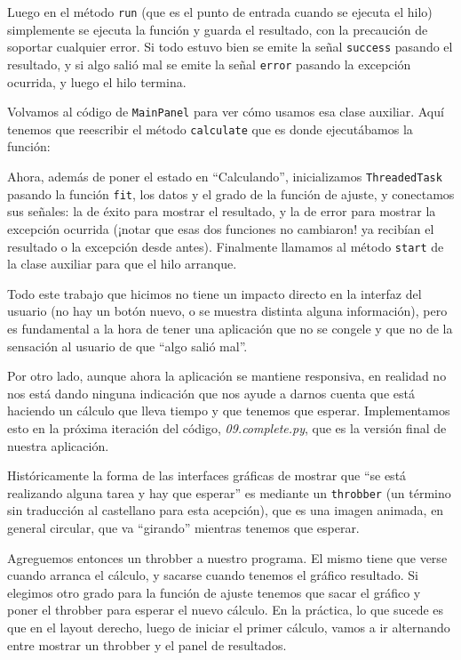 Luego en el método \texttt{run} (que es el punto de entrada cuando se ejecuta el hilo) simplemente se ejecuta la función y guarda el resultado, con la precaución de soportar cualquier error. Si todo estuvo bien se emite la señal \texttt{success} pasando el resultado, y si algo salió mal se emite la señal \texttt{error} pasando la excepción ocurrida, y luego el hilo termina.

Volvamos al código de \texttt{MainPanel} para ver cómo usamos esa clase auxiliar. Aquí tenemos que reescribir el método \texttt{calculate} que es donde ejecutábamos la función:


Ahora, además de poner el estado en ``Calculando'', inicializamos \texttt{ThreadedTask} pasando la función \texttt{fit}, los datos y el grado de la función de ajuste, y conectamos sus señales: la de éxito para mostrar el resultado, y la de error para mostrar la excepción ocurrida (¡notar que esas dos funciones no cambiaron! ya recibían el resultado o la excepción desde antes). Finalmente llamamos al método \texttt{start} de la clase auxiliar para que el hilo arranque.

Todo este trabajo que hicimos no tiene un impacto directo en la interfaz del usuario (no hay un botón nuevo, o se muestra distinta alguna información), pero es fundamental a la hora de tener una aplicación que no se congele y que no de la sensación al usuario de que ``algo salió mal''.

Por otro lado, aunque ahora la aplicación se mantiene responsiva, en realidad no nos está dando ninguna indicación que nos ayude a darnos cuenta que está haciendo un cálculo que lleva tiempo y que tenemos que esperar. Implementamos esto en la próxima iteración del código, \textit{09.complete.py}, que es la versión final de nuestra aplicación.

Históricamente la forma de las interfaces gráficas de mostrar que ``se está realizando alguna tarea y hay que esperar'' es mediante un \texttt{throbber} (un término sin traducción al castellano para esta acepción), que es una imagen animada, en general circular, que va ``girando'' mientras tenemos que esperar.

Agreguemos entonces un throbber a nuestro programa. El mismo tiene que verse cuando arranca el cálculo, y sacarse cuando tenemos el gráfico resultado. Si elegimos otro grado para la función de ajuste tenemos que sacar el gráfico y poner el throbber para esperar el nuevo cálculo. En la práctica, lo que sucede es que en el layout derecho, luego de iniciar el primer cálculo, vamos a ir alternando entre mostrar un throbber y el panel de resultados.

